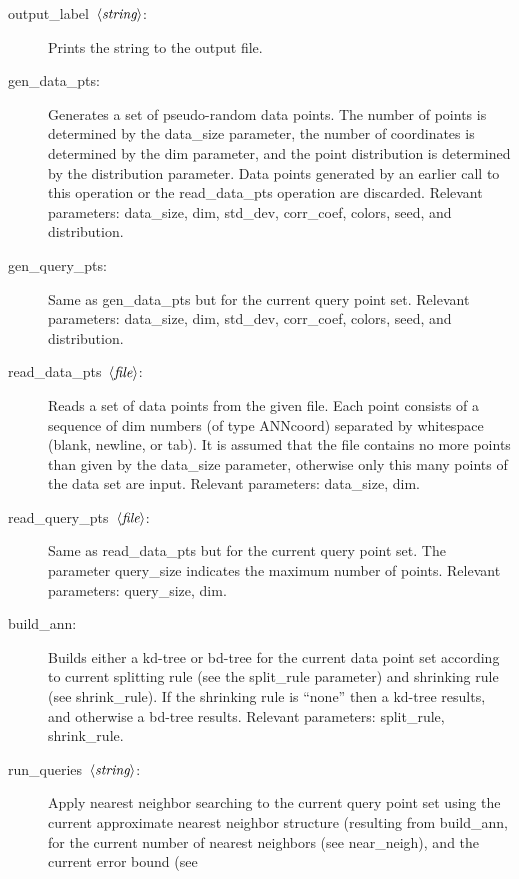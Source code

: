 \documentclass[11pt]{article}		%
\newcommand\ang[1]{\langle #1\rangle}
\newcommand{\STRING}[0]{$\ang{\textit{string}\/}$}
\newcommand{\FILE}[0]{$\ang{\textit{file}\/}$}
\begin{document}
\begin{description}
\item[\hbox{\sf output\_label \STRING:}]
	Prints the string to the output file.
\item[\hbox{\sf gen\_data\_pts:}]
	Generates a set of pseudo-random data points.  The number of points
	is determined by the \textsf{data\_size} parameter, the number of
	coordinates is determined by the \textsf{dim} parameter, and the point
	distribution is determined by the \textsf{distribution} parameter.
	Data points generated by an earlier call to this operation or the
	\textsf{read\_data\_pts} operation are discarded.  Relevant parameters:
	\textsf{data\_size}, \textsf{dim}, \textsf{std\_dev}, \textsf{corr\_coef},
	\textsf{colors}, \textsf{seed}, and \textsf{distribution}.
\item[\hbox{\sf gen\_query\_pts:}]
	Same as \textsf{gen\_data\_pts} but for the current query point set.
	Relevant parameters: \textsf{data\_size}, \textsf{dim}, \textsf{std\_dev},
	\textsf{corr\_coef}, \textsf{colors}, \textsf{seed}, and \textsf{distribution}.
\item[\hbox{\sf read\_data\_pts \FILE:}]
	Reads a set of data points from the given file.  Each point consists
	of a sequence of \textsf{dim} numbers (of type \textsf{ANNcoord}) separated
	by whitespace (blank, newline, or tab).  It is assumed that the
	file contains no more points than given by the \textsf{data\_size}
	parameter, otherwise only this many points of the data set are input.
	Relevant parameters: \textsf{data\_size}, \textsf{dim}.
\item[\hbox{\sf read\_query\_pts \FILE:}]
	Same as \textsf{read\_data\_pts} but for the current query point set.
	The parameter \textsf{query\_size} indicates the maximum number of
	points.  Relevant parameters: \textsf{query\_size}, \textsf{dim}.
\item[\hbox{\sf build\_ann:}] Builds either a kd-tree or bd-tree for the
	current data point set according to current splitting rule (see
	the \textsf{split\_rule} parameter) and shrinking rule (see
	\textsf{shrink\_rule}).  If the shrinking rule is ``none'' then a
	kd-tree results, and otherwise a bd-tree results.  Relevant
	parameters: \textsf{split\_rule}, \textsf{shrink\_rule}.
\item[\hbox{\sf run\_queries \STRING:}]
	Apply nearest neighbor searching to the current query point set
	using the current approximate nearest neighbor structure (resulting
	from \textsf{build\_ann}, for the current number of nearest neighbors
	(see \textsf{near\_neigh}), and the current error bound (see

\end{description}
\end{document}
